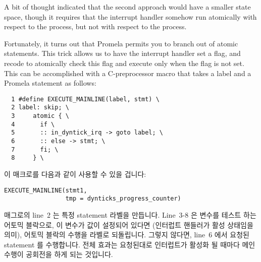 A bit of thought indicated that the second approach would have a
smaller state space, though it requires that the interrupt handler
somehow run atomically with respect to the 
process, but not with respect to the 
process.

Fortunately, it turns out that Promela permits you to branch
out of atomic statements.
This trick allows us to have the interrupt handler set a flag, and
recode  to atomically check this flag
and execute only when the flag is not set.
This can be accomplished with a C-preprocessor macro that takes
a label and a Promela statement as follows:
\fi

{ \scriptsize
\begin{verbatim}
  1 #define EXECUTE_MAINLINE(label, stmt) \
  2 label: skip; \
  3     atomic { \
  4       if \
  5       :: in_dyntick_irq -> goto label; \
  6       :: else -> stmt; \
  7       fi; \
  8     } \
\end{verbatim}
}

이 매크로를 다음과 같이 사용할 수 있을 겁니다:
\iffalse

One might use this macro as follows:
\fi

\vspace{5pt}
\begin{minipage}[t]{\columnwidth}
\scriptsize
\begin{verbatim}
EXECUTE_MAINLINE(stmt1,
                 tmp = dynticks_progress_counter)
\end{verbatim}
\end{minipage}
\vspace{5pt}

매그로의 line~2 는 특정 statement 라벨을 만듭니다.
Line~3-8 은  변수를 테스트 하는 어토믹 블락으로, 이 변수가
값이 설정되어 있다면 (인터럽트 핸들러가 활성 상태임을 의미), 어토믹 블락의
수행을 라벨로 되돌립니다.
그렇지 않다면, line~6 에서 요청된 statement 를 수행합니다.
전체 효과는 요청된대로 인터럽트가 활성화 될 때마다 메인 수행이 공회전을 하게
되는 것입니다.
\iffalse

Line~2 of the macro creates the specified statement label.
Lines~3-8 are an atomic block that tests the \co{in_dyntick_irq}
variable, and if this variable is set (indicating that the interrupt
handler is active), branches out of the atomic block back to the
label.
Otherwise, line~6 executes the specified statement.
The overall effect is that mainline execution stalls any time an interrupt
is active, as required.
\fi


